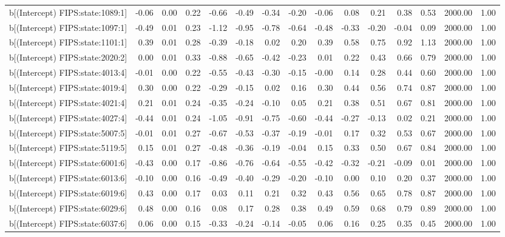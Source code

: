 \begin{table}[ht]
\begin{tabular}{rrrrrrrrrrrrrrr}
  b[(Intercept) FIPS:state:1089:1] & -0.06 & 0.00 & 0.22 & -0.66 & -0.49 & -0.34 & -0.20 & -0.06 & 0.08 & 0.21 & 0.38 & 0.53 & 2000.00 & 1.00 \\ 
  b[(Intercept) FIPS:state:1097:1] & -0.49 & 0.01 & 0.23 & -1.12 & -0.95 & -0.78 & -0.64 & -0.48 & -0.33 & -0.20 & -0.04 & 0.09 & 2000.00 & 1.00 \\ 
  b[(Intercept) FIPS:state:1101:1] & 0.39 & 0.01 & 0.28 & -0.39 & -0.18 & 0.02 & 0.20 & 0.39 & 0.58 & 0.75 & 0.92 & 1.13 & 2000.00 & 1.00 \\ 
  b[(Intercept) FIPS:state:2020:2] & 0.00 & 0.01 & 0.33 & -0.88 & -0.65 & -0.42 & -0.23 & 0.01 & 0.22 & 0.43 & 0.66 & 0.79 & 2000.00 & 1.00 \\ 
  b[(Intercept) FIPS:state:4013:4] & -0.01 & 0.00 & 0.22 & -0.55 & -0.43 & -0.30 & -0.15 & -0.00 & 0.14 & 0.28 & 0.44 & 0.60 & 2000.00 & 1.00 \\ 
  b[(Intercept) FIPS:state:4019:4] & 0.30 & 0.00 & 0.22 & -0.29 & -0.15 & 0.02 & 0.16 & 0.30 & 0.44 & 0.56 & 0.74 & 0.87 & 2000.00 & 1.00 \\ 
  b[(Intercept) FIPS:state:4021:4] & 0.21 & 0.01 & 0.24 & -0.35 & -0.24 & -0.10 & 0.05 & 0.21 & 0.38 & 0.51 & 0.67 & 0.81 & 2000.00 & 1.00 \\ 
  b[(Intercept) FIPS:state:4027:4] & -0.44 & 0.01 & 0.24 & -1.05 & -0.91 & -0.75 & -0.60 & -0.44 & -0.27 & -0.13 & 0.02 & 0.21 & 2000.00 & 1.00 \\ 
  b[(Intercept) FIPS:state:5007:5] & -0.01 & 0.01 & 0.27 & -0.67 & -0.53 & -0.37 & -0.19 & -0.01 & 0.17 & 0.32 & 0.53 & 0.67 & 2000.00 & 1.00 \\ 
  b[(Intercept) FIPS:state:5119:5] & 0.15 & 0.01 & 0.27 & -0.48 & -0.36 & -0.19 & -0.04 & 0.15 & 0.33 & 0.50 & 0.67 & 0.84 & 2000.00 & 1.00 \\ 
  b[(Intercept) FIPS:state:6001:6] & -0.43 & 0.00 & 0.17 & -0.86 & -0.76 & -0.64 & -0.55 & -0.42 & -0.32 & -0.21 & -0.09 & 0.01 & 2000.00 & 1.00 \\ 
  b[(Intercept) FIPS:state:6013:6] & -0.10 & 0.00 & 0.16 & -0.49 & -0.40 & -0.29 & -0.20 & -0.10 & 0.00 & 0.10 & 0.20 & 0.37 & 2000.00 & 1.00 \\ 
  b[(Intercept) FIPS:state:6019:6] & 0.43 & 0.00 & 0.17 & 0.03 & 0.11 & 0.21 & 0.32 & 0.43 & 0.56 & 0.65 & 0.78 & 0.87 & 2000.00 & 1.00 \\ 
  b[(Intercept) FIPS:state:6029:6] & 0.48 & 0.00 & 0.16 & 0.08 & 0.17 & 0.28 & 0.38 & 0.49 & 0.59 & 0.68 & 0.79 & 0.89 & 2000.00 & 1.00 \\ 
  b[(Intercept) FIPS:state:6037:6] & 0.06 & 0.00 & 0.15 & -0.33 & -0.24 & -0.14 & -0.05 & 0.06 & 0.16 & 0.25 & 0.35 & 0.45 & 2000.00 & 1.00 \\ 

\end{tabular}
\end{table}
